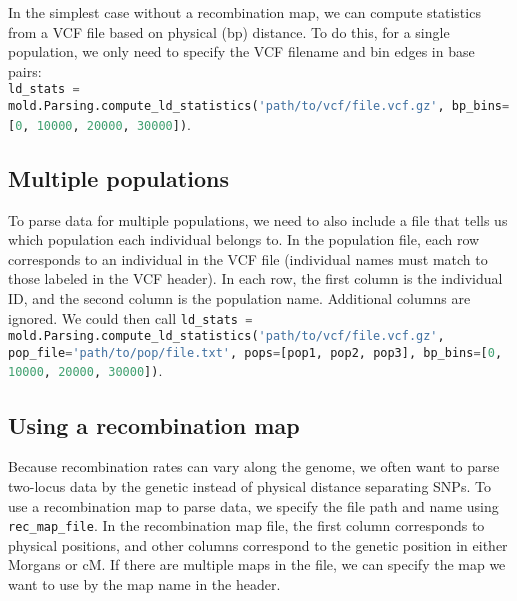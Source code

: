 \documentclass[10pt]{article}
\makeatletter
\newcommand{\py}[1]{\lstinline[breaklines=true,language=Python, showstringspaces=False]@#1@}
\makeatother
\begin{document}
In the simplest case without a recombination map, we can compute statistics from a VCF file based on physical (bp) distance.
To do this, for a single population, we only need to specify the VCF filename and bin edges in base pairs:\\
\py{ld_stats = mold.Parsing.compute_ld_statistics('path/to/vcf/file.vcf.gz', bp_bins=[0, 10000, 20000, 30000])}.

\subsection{Multiple populations}

To parse data for multiple populations, we need to also include a file that tells us which population each individual belongs to.
In the population file, each row corresponds to an individual in the VCF file (individual names must match to those labeled in the VCF header).
In each row, the first column is the individual ID, and the second column is the population name.
Additional columns are ignored.
We could then call \py{ld_stats = mold.Parsing.compute_ld_statistics('path/to/vcf/file.vcf.gz', pop_file='path/to/pop/file.txt', pops=[pop1, pop2, pop3], bp_bins=[0, 10000, 20000, 30000])}.

\subsection{Using a recombination map}

Because recombination rates can vary along the genome, we often want to parse two-locus data by the genetic instead of physical distance separating SNPs.
To use a recombination map to parse data, we specify the file path and name using \py{rec_map_file}.
In the recombination map file, the first column corresponds to physical positions, and other columns correspond to the genetic position in either Morgans or cM.
If there are multiple maps in the file, we can specify the map we want to use by the map name in the header.
\end{document}
